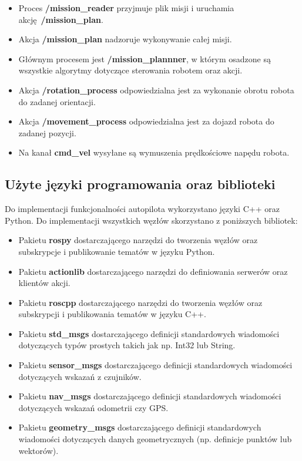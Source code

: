 {{\begin{itemize}
            \item Proces \textbf{/mission\_reader} przyjmuje plik misji i uruchamia  akcję~\textbf{/mission\_plan}.
            \item Akcja \textbf{/mission\_plan} nadzoruje wykonywanie całej misji.
            \item Głównym procesem jest \textbf{/mission\_plannner}, w którym osadzone są wszystkie algorytmy dotyczące sterowania robotem oraz akcji.
            \item Akcja \textbf{/rotation\_process} odpowiedzialna jest za wykonanie obrotu robota do zadanej orientacji.
            \item Akcja \textbf{/movement\_process} odpowiedzialna jest za dojazd robota do zadanej pozycji.
            \item Na kanał \textbf{cmd\_vel} wysyłane są wymuszenia prędkościowe napędu robota.
        \end{itemize}
        
    }
    \subsection{Użyte języki programowania oraz biblioteki}
    {
        Do implementacji funkcjonalności autopilota wykorzystano języki C++ oraz Python. Do implementacji wszystkich węzłów skorzystano z poniższych bibliotek:
        \begin{itemize}
            \item Pakietu \textbf{rospy} dostarczającego narzędzi do tworzenia węzłów oraz subskrypcje i publikowanie tematów w języku Python.
            \item Pakietu \textbf{actionlib} dostarczającego narzędzi do definiowania serwerów oraz klientów akcji.
            \item Pakietu \textbf{roscpp} dostarczającego narzędzi do tworzenia węzłów oraz subskrypcji i publikowania tematów w języku C++.
            \item Pakietu \textbf{std\_msgs} dostarczającego definicji standardowych wiadomości dotyczących typów prostych takich jak np. Int32 lub String.
            \item Pakietu \textbf{sensor\_msgs} dostarczającego definicji standardowych wiadomości dotyczących wskazań z czujników.
            \item Pakietu \textbf{nav\_msgs} dostarczającego definicji standardowych wiadomości dotyczących wskazań odometrii czy GPS.
            \item Pakietu \textbf{geometry\_msgs} dostarczającego definicji standardowych wiadomości dotyczących danych geometrycznych (np. definicje punktów lub wektorów).
        \end{itemize}

}}
